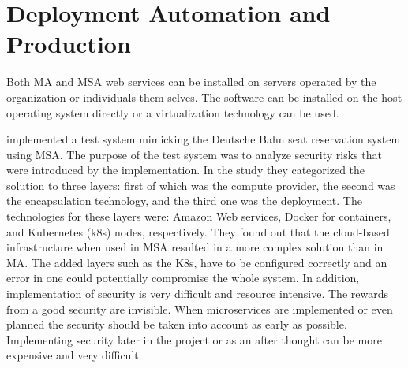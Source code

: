 

\section{Deployment Automation and Production}
\begin{sloppypar}
    Both MA and MSA web services can be installed on servers operated by the
    organization or individuals them selves. The software can be installed on
    the host operating system directly or a virtualization technology can be
    used.
\end{sloppypar}
\begin{sloppypar}
    \citet{closer18} implemented a test system mimicking the Deutsche Bahn seat
    reservation system using MSA. The purpose of the test system was to analyze
    security risks that were introduced by the implementation. In the study they
    categorized the solution to three layers: first of which was the compute
    provider, the second was the encapsulation technology, and the third one was
    the deployment. The technologies for these layers were: Amazon Web services,
    Docker for containers, and Kubernetes (k8s) nodes, respectively. They found
    out that the cloud-based infrastructure when used in MSA resulted in a more
    complex solution than in MA. The added layers such as the K8s, have to be
    configured correctly and an error in one could potentially compromise the
    whole system. In addition, implementation of security is very difficult and
    resource intensive. The rewards from a good security are invisible. When
    microservices are implemented or even planned the security should be taken
    into account as early as possible. Implementing security later in the
    project or as an after thought can be more expensive and very difficult.
\end{sloppypar}

